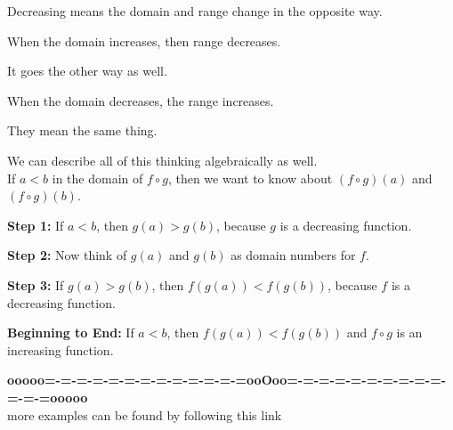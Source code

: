 \documentclass{ximera}
\begin{document}
\begin{warning}

Decreasing means the domain and range change in the opposite way.

When the domain increases, then range decreases.

It goes the other way as well.

When the domain decreases, the range increases.

They mean the same thing.


\end{warning}






We can describe all of this thinking algebraically as well. \\


If $a < b$ in the domain of $f \circ g$, then we want to know about $(f \circ g)(a)$  and $(f \circ g)(b)$.



\textbf{Step 1:}  If $a < b$, then $g(a) > g(b)$, because $g$ is a decreasing function.


\textbf{Step 2:}  Now think of $g(a)$ and $g(b)$ as domain numbers for $f$.


\textbf{Step 3:}  If $g(a) > g(b)$, then $f(g(a)) < f(g(b))$, because $f$ is a decreasing function.


\textbf{Beginning to End:} If $a < b$, then $f(g(a)) < f(g(b))$ and $f \circ g$ is an increasing function.




































\begin{center}
\textbf{\textcolor{green!50!black}{ooooo=-=-=-=-=-=-=-=-=-=-=-=-=ooOoo=-=-=-=-=-=-=-=-=-=-=-=-=ooooo}} \\

more examples can be found by following this link\\ 

\end{center}
\end{document}
